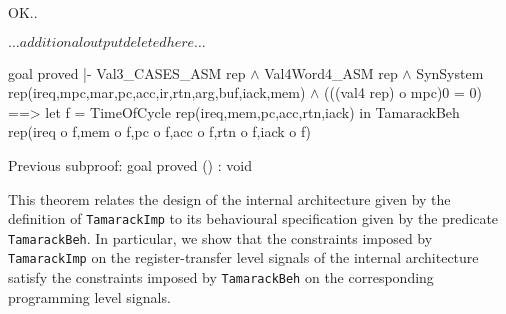 \begintt
OK..

\( \ldots additional output deleted here \ldots \)

goal proved
|- Val3_CASES_ASM rep \(\wedge\)
   Val4Word4_ASM rep \(\wedge\)
   SynSystem rep(ireq,mpc,mar,pc,acc,ir,rtn,arg,buf,iack,mem) \(\wedge\)
   (((val4 rep) o mpc)0 = 0) ==>
   let f = TimeOfCycle rep(ireq,mem,pc,acc,rtn,iack)
   in
    TamarackBeh rep(ireq o f,mem o f,pc o f,acc o f,rtn o f,iack o f)

Previous subproof:
goal proved
() : void
\endtt

This theorem
relates the design of the internal architecture given by the
definition of \verb"TamarackImp" to its behavioural specification
given by the predicate \verb"TamarackBeh".
In particular, we show that the constraints imposed by
\verb"TamarackImp" on the register-transfer level signals
of the internal architecture satisfy the constraints imposed by
\verb"TamarackBeh" on the corresponding programming level signals.
